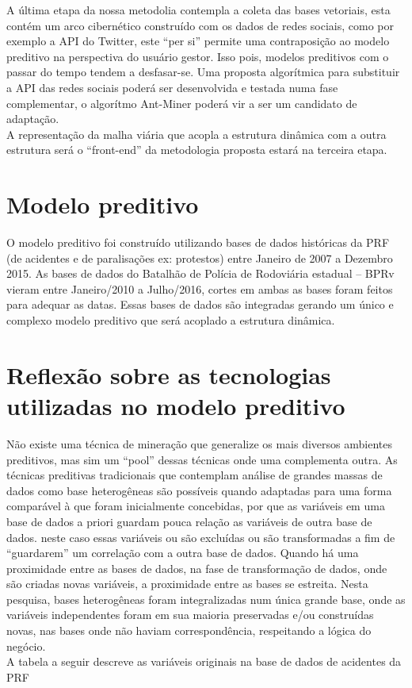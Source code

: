  A última etapa da nossa metodolia contempla a coleta das bases vetoriais, esta contém um arco cibernético construído com os dados de redes sociais, como por exemplo a API do Twitter, este ``per si'' 
 permite uma contraposição ao modelo preditivo na perspectiva do usuário gestor. Isso pois, modelos preditivos com o passar do tempo tendem a desfasar-se. 
 Uma proposta algorítmica para substituir a API das redes sociais 
 poderá ser desenvolvida e testada numa fase complementar, o algorítmo Ant-Miner poderá vir a ser um candidato de adaptação.\\
 
 A representação da malha viária que acopla a estrutura dinâmica com a outra estrutura será o ``front-end'' da metodologia proposta estará na 
 terceira etapa.


\section{ Modelo preditivo}

O modelo preditivo foi construído utilizando bases de dados históricas da PRF (de acidentes e de paralisações ex: protestos) entre Janeiro de 2007 a 
Dezembro 2015. As bases de dados do Batalhão de Polícia de Rodoviária estadual -- BPRv vieram entre Janeiro/2010 a Julho/2016, cortes em ambas as bases foram 
feitos para adequar as datas. Essas bases de dados são integradas gerando um único e complexo modelo preditivo que será acoplado a estrutura dinâmica.



\section{ Reflexão sobre as tecnologias utilizadas no modelo preditivo}\label{result}

Não existe uma técnica de mineração que generalize os mais diversos ambientes preditivos, mas sim um ``pool'' dessas técnicas onde uma complementa outra.
As técnicas preditivas tradicionais que contemplam análise de grandes massas de dados como base heterogêneas são possíveis quando adaptadas para uma forma comparável à que
foram inicialmente concebidas, por que as variáveis em uma base de dados a priori guardam pouca relação as variáveis de outra base de dados.
neste caso essas variáveis ou são excluídas ou são transformadas a fim de ``guardarem'' um correlação com a outra base de dados. 
Quando há uma proximidade entre as bases de dados, na fase de transformação de dados, onde são criadas novas variáveis, a proximidade entre as
bases se estreita. 
Nesta pesquisa, bases heterogêneas foram integralizadas num única grande base, onde as variáveis independentes foram
em sua maioria preservadas e/ou construídas novas, nas bases onde não haviam correspondência, respeitando a lógica do negócio.\\
A tabela a seguir descreve as variáveis originais na base de dados de acidentes da PRF 



